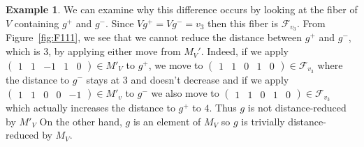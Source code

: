 \documentclass[a4paper, 12pt]{article}
\theoremstyle{plain}
\theoremstyle{definition}
\newtheorem{example}[theorem]{Example}
\theoremstyle{remark}
\begin{document}
\begin{example}
We can examine why this difference occurs by looking at the fiber of $V$ containing $g^+$ and $g^-$. %
Since $V g^+=Vg^-=v_3$ then this fiber is $\mathcal{F}_{v_3}$. From Figure~\ref{fig:F111}, we see that we cannot reduce the distance between $g^+$ and $g^-$, which is $3$, by applying either move from $M_V'$. Indeed, if we apply $\begin{pmatrix}1&1&-1&1&0\end{pmatrix} \in M'_V$ to $g^+$, we move to $\begin{pmatrix}1&1&0&1&0\end{pmatrix} \in \mathcal{F}_{v_3}$ where the distance to $g^-$ stays at $3$ and doesn't decrease and if we apply $\begin{pmatrix}1&1&0&0&-1\end{pmatrix} \in M'_v$ to $g^-$ we also move to $\begin{pmatrix}1&1&0&1&0\end{pmatrix} \in \mathcal{F}_{v_3}$ which actually increases the distance to $g^+$ to $4$. Thus $g$ is not distance-reduced by $M'_V$ On the other hand, $g $ is an element of $ M_V$ so $g$ is trivially distance-reduced by $M_V$.


\end{example}
\end{document}
